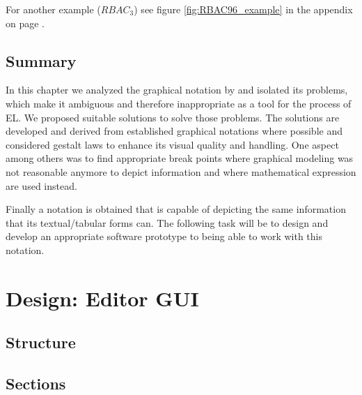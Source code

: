 \documentclass[twoside, openright, 12pt]{book}
\begin{document}
For another example ($RBAC_3$) see figure \ref{fig:RBAC96_example} in the appendix on page \pageref{fig:RBAC96_example}.




\section{Summary}
\label{gsl_summary}
In this chapter we analyzed the graphical notation by \cite{Amthor18} and isolated its problems, which make it ambiguous and therefore inappropriate as a tool for the process of EL.
We proposed suitable solutions to solve those problems.
The solutions are developed and derived from established graphical notations where possible and considered gestalt laws to enhance its visual quality and handling.
One aspect among others was to find appropriate break points where graphical modeling was not reasonable anymore to depict information and where mathematical expression are used instead.

Finally a notation is obtained that is capable of depicting the same information that its textual/tabular forms can.
The following task will be to design and develop an appropriate software prototype to being able to work with this notation.



\cleardoublepage
\chapter{Design: Editor GUI}
\label{editor_design}


\section{Structure}
\label{editor_structure}

\section{Sections}
\label{editor_sections}
\end{document}
